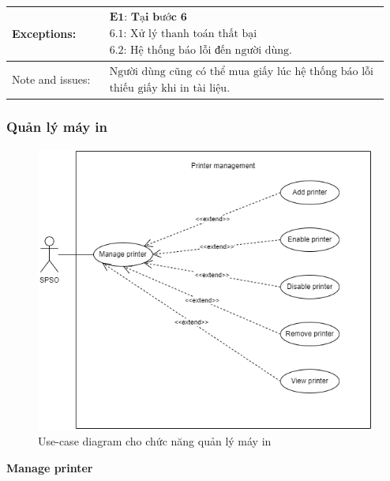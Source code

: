 \begin{tabular}{|l|l|l|l|}
\hline Exceptions: & \multicolumn{3}{|l|}{$\begin{array}{l}\textbf{ E1: Tại bước 6 } \\
\text{ 6.1: Xử lý thanh toán thất bại } \\
\text{ 6.2: Hệ thống báo lỗi đến người dùng. }
\end{array}$} \\
\hline Note and issues: & \multicolumn{3}{|l|}{$\begin{array}{l}
\text{ Người dùng cũng có thể mua giấy lúc hệ thống báo lỗi} \\ 
\text{ thiếu giấy khi in tài liệu. } \end{array}$} \\
\hline
\end{tabular}

\subsubsection{Quản lý máy in}
\begin{figure}[H]
    \begin{center}
        \includegraphics[width=1\textwidth]{Images/Requirement Elicitation/PM_Use-case.png}
        \caption{Use-case diagram cho chức năng quản lý máy in}
        \label{fig:arch}
    \end{center}
\end{figure}
\textbf{Manage printer}\par
